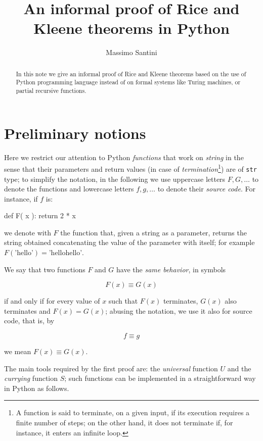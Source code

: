 \documentclass[a4paper]{article}
\title{An informal proof of Rice and Kleene theorems in Python}
\author{Massimo Santini} %
\begin{document}
\maketitle

\begin{abstract}

In this note we give an informal proof of Rice and Kleene theorems based on
the use of Python programming language instead of on formal systems like
Turing machines, or partial recursive functions.

\end{abstract}

\section*{Preliminary notions}

Here we restrict our attention to Python \emph{functions} that work on
\emph{string} in the sense that their parameters and return values (in case of
\emph{termination}\footnote{A function is said to terminate, on a given input,
if its execution requires a finite number of steps; on the other hand, it does
not terminate if, for instance, it enters an infinite loop.}) are of
\verb|str| type; to simplify the notation, in the following  we use uppercase
letters $F, G, \ldots$ to denote the functions and lowercase letters $f, g,
\ldots$ to denote their \emph{source code}. For instance, if $f$ is:

\begin{pycode}
def F( x ):
	return 2 * x
\end{pycode}

we denote with $F$ the function that, given a string as a parameter, returns
the string obtained concatenating the value of the parameter with itself; for
example $F(\text{'hello'})=\text{'hellohello'}$.

We say that two functions $F$ and $G$ have the \emph{same behavior}, in
symbols

\[
	F( x ) \equiv G( x )
\]

if and only if for every value of $x$ such that $F(x)$ terminates, $G(x)$ also
terminates and $F(x)=G(x)$; abusing the notation, we use it also for source
code, that is, by

\[
  f \equiv g
\]

we mean $F( x ) \equiv G( x )$.

The main tools required by the first proof are: the  \emph{universal} function
$U$ and the \emph{currying} function $S$; such functions can be implemented in
a straightforward way in Python as follows.
\end{document}
